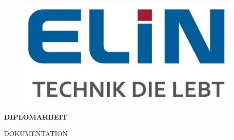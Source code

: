 \begin{figure}[H]
	\begin{center}
		\includegraphics[scale=0.7]{figures/allgemein/Elin Logo.png}
	\end{center}
\end{figure}
\vspace{1cm}



\vspace{2cm}


\newpage
\thispagestyle{empty}
\mbox{}
\newpage


\centering
\begin{huge}
\textbf{DIPLOMARBEIT}
\end{huge}

\begin{large}
DOKUMENTATION
\end{large}

